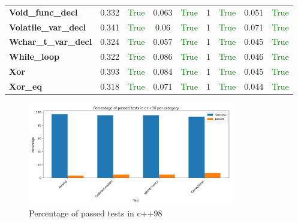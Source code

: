 \documentclass{article}
\begin{document}
\begin{xltabular}{\textwidth}{lcccccccc}
\textbf{{\fontsize{10}{12}\selectfont Void\_func\_decl}}& 0.332&\textcolor{green}{True}& 0.063&\textcolor{green}{True}& 1&\textcolor{green}{True}& 0.051&\textcolor{green}{True} \\[0.5ex]
\textbf{{\fontsize{10}{12}\selectfont Volatile\_var\_decl}}& 0.341&\textcolor{green}{True}& 0.06&\textcolor{green}{True}& 1&\textcolor{green}{True}& 0.071&\textcolor{green}{True} \\[0.5ex]
\textbf{{\fontsize{10}{12}\selectfont Wchar\_t\_var\_decl}}& 0.324&\textcolor{green}{True}& 0.057&\textcolor{green}{True}& 1&\textcolor{green}{True}& 0.045&\textcolor{green}{True} \\[0.5ex]
\textbf{{\fontsize{10}{12}\selectfont While\_loop}}& 0.322&\textcolor{green}{True}& 0.086&\textcolor{green}{True}& 1&\textcolor{green}{True}& 0.046&\textcolor{green}{True} \\[0.5ex]
\textbf{{\fontsize{10}{12}\selectfont Xor}}& 0.393&\textcolor{green}{True}& 0.084&\textcolor{green}{True}& 1&\textcolor{green}{True}& 0.045&\textcolor{green}{True} \\[0.5ex]
\textbf{{\fontsize{10}{12}\selectfont Xor\_eq}}& 0.318&\textcolor{green}{True}& 0.071&\textcolor{green}{True}& 1&\textcolor{green}{True}& 0.044&\textcolor{green}{True} \\[0.5ex]
\bottomrule
\end{xltabular}
\newpage
\begin{figure}[h!]
\centering
\includegraphics[width=0.8\textwidth]{../reports/clava/images/c++98_percentage.png}
\caption{Percentage of passed tests in c++98}
\label{fig:c++98_percentage}
\end{figure}
\newpage
\end{document}
